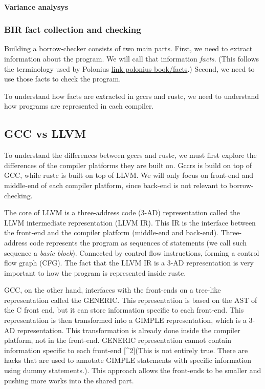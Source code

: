 \hypertarget{variance-analysys}{%
\paragraph{Variance analysys}\label{variance-analysys}}

\hypertarget{bir-fact-collection-and-checking}{%
\subsubsection{BIR fact collection and
checking}\label{bir-fact-collection-and-checking}}

Building a borrow-checker consists of two main parts. First, we need to
extract information about the program. We will call that information
\emph{facts}. (This follows the terminology used by Polonius
\href{}{link polonius book/facts}.) Second, we need to use those facts
to check the program.

To understand how facts are extracted in gccrs and rustc, we need to
understand how programs are represented in each compiler.

\hypertarget{gcc-vs-llvm}{%
\subsection{GCC vs LLVM}\label{gcc-vs-llvm}}

To understand the differences between gccrs and rustc, we must first
explore the differences of the compiler platforms they are built on.
Gccrs is build on top of GCC, while rustc is built on top of LLVM. We
will only focus on front-end and middle-end of each compiler platform,
since back-end is not relevant to borrow-checking.

The core of LLVM is a three-address code (3-AD) representation called
the LLVM intermediate representation (LLVM IR). This IR is the interface
between the front-end and the compiler platform (middle-end and
back-end). Three-address code represents the program as sequences of
statements (we call such sequence a \emph{basic block}). Connected by
control flow instructions, forming a control flow graph (CFG). The fact
that the LLVM IR is a 3-AD representation is very important to how the
program is represented inside rustc.

GCC, on the other hand, interfaces with the front-ends on a tree-like
representation called the GENERIC. This representation is based on the
AST of the C front end, but it can store information specific to each
front-end. This representation is then transformed into a GIMPLE
representation, which is a 3-AD representation. This transformation is
already done inside the compiler platform, not in the front-end. GENERIC
representation cannot contain information specific to each front-end
{[}\^{}2{]}(This is not entirely true. There are hacks that are used to
annotate GIMPLE statements with specific information using dummy
statements.). This approach allows the front-ends to be smaller and
pushing more works into the shared part.

